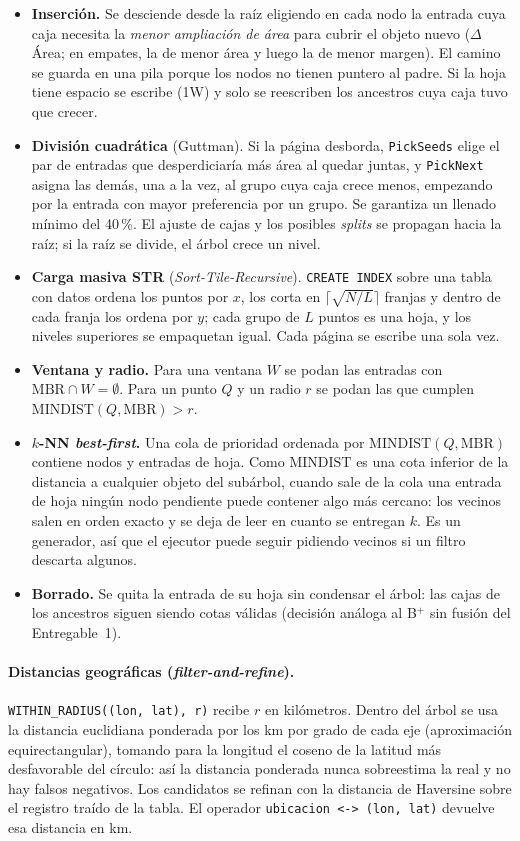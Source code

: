 \documentclass[11pt,a4paper]{article}
\newcommand{\code}[1]{\texttt{#1}}
\begin{document}
\begin{itemize}
\item \textbf{Inserción.} Se desciende desde la raíz eligiendo en cada nodo la entrada cuya caja
  necesita la \emph{menor ampliación de área} para cubrir el objeto nuevo ($\Delta$Área; en empates,
  la de menor área y luego la de menor margen). El camino se guarda en una pila porque los nodos no
  tienen puntero al padre. Si la hoja tiene espacio se escribe (1W) y solo se reescriben los ancestros
  cuya caja tuvo que crecer.
\item \textbf{División cuadrática} (Guttman). Si la página desborda, \code{PickSeeds} elige el par de
  entradas que desperdiciaría más área al quedar juntas, y \code{PickNext} asigna las demás, una a la
  vez, al grupo cuya caja crece menos, empezando por la entrada con mayor preferencia por un grupo.
  Se garantiza un llenado mínimo del 40\,\%. El ajuste de cajas y los posibles \emph{splits} se
  propagan hacia la raíz; si la raíz se divide, el árbol crece un nivel.
\item \textbf{Carga masiva STR} (\emph{Sort-Tile-Recursive}). \code{CREATE INDEX} sobre una tabla con
  datos ordena los puntos por $x$, los corta en $\lceil\sqrt{N/L}\rceil$ franjas y dentro de cada
  franja los ordena por $y$; cada grupo de $L$ puntos es una hoja, y los niveles superiores se
  empaquetan igual. Cada página se escribe una sola vez.
\item \textbf{Ventana y radio.} Para una ventana $W$ se podan las entradas con $\text{MBR}\cap
  W=\emptyset$. Para un punto $Q$ y un radio $r$ se podan las que cumplen
  $\text{MINDIST}(Q,\text{MBR})>r$.
\item \textbf{$k$-NN \emph{best-first}.} Una cola de prioridad ordenada por $\text{MINDIST}(Q,
  \text{MBR})$ contiene nodos y entradas de hoja. Como $\text{MINDIST}$ es una cota inferior de la
  distancia a cualquier objeto del subárbol, cuando sale de la cola una entrada de hoja ningún nodo
  pendiente puede contener algo más cercano: los vecinos salen en orden exacto y se deja de leer en
  cuanto se entregan $k$. Es un generador, así que el ejecutor puede seguir pidiendo vecinos si un
  filtro descarta algunos.
\item \textbf{Borrado.} Se quita la entrada de su hoja sin condensar el árbol: las cajas de los
  ancestros siguen siendo cotas válidas (decisión análoga al B$^+$ sin fusión del Entregable~1).
\end{itemize}

\paragraph{Distancias geográficas (\emph{filter-and-refine}).} \code{WITHIN\_RADIUS((lon, lat), r)}
recibe $r$ en kilómetros. Dentro del árbol se usa la distancia euclidiana ponderada por los km por
grado de cada eje (aproximación equirectangular), tomando para la longitud el coseno de la latitud
más desfavorable del círculo: así la distancia ponderada nunca sobreestima la real y no hay falsos
negativos. Los candidatos se refinan con la distancia de Haversine sobre el registro traído de la
tabla. El operador \code{ubicacion <-> (lon, lat)} devuelve esa distancia en km.
\end{document}
